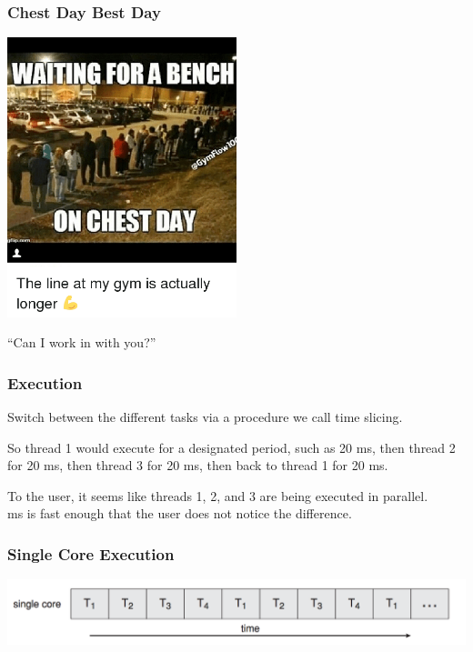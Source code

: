 \begin{frame}
	\frametitle{Chest Day Best Day}

	\begin{center}
		\includegraphics[width=0.5\textwidth]{images/chestdaybestday.png}
	\end{center}

	``Can I work in with you?''

\end{frame}


\begin{frame}
	\frametitle{Execution}


	Switch between the different tasks via a procedure we call \alert{time slicing}.

	So thread 1 would execute for a designated period, such as 20 ms, then thread 2 for 20 ms, then thread 3 for 20 ms, then back to thread 1 for 20 ms.

	To the user, it seems like threads 1, 2, and 3 are being executed in parallel.\\
	 ms is fast enough that the user does not notice the difference.

\end{frame}


\begin{frame}
	\frametitle{Single Core Execution}

	\begin{center}
		\includegraphics[width=\textwidth]{images/single-core-execution.png}
	\end{center}

\end{frame}


